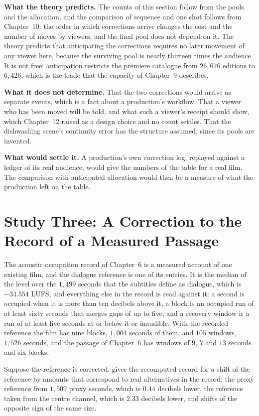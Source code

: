 \documentclass[11pt,twoside,openright]{book}
\theoremstyle{plain}
\theoremstyle{definition}
\theoremstyle{remark}
\begin{document}
\textbf{What the theory predicts.} The counts of this section follow from the pools and the allocation, and the comparison of sequence and one shot follows from Chapter~10: the order in which corrections arrive changes the cost and the number of moves by viewers, and the final pool does not depend on it. The theory predicts that anticipating the corrections requires no later movement of any viewer here, because the surviving pool is nearly thirteen times the audience. It is not free: anticipation restricts the premiere catalogue from $26{,}676$ editions to $6{,}426$, which is the trade that the capacity of Chapter~9 describes.

\textbf{What it does not determine.} That the two corrections would arrive as separate events, which is a fact about a production's workflow. That a viewer who has been moved will be told, and what such a viewer's receipt should show, which Chapter~12 raised as a design choice and no count settles. That the dishwashing scene's continuity error has the structure assumed, since its pools are invented.

\textbf{What would settle it.} A production's own correction log, replayed against a ledger of its real audience, would give the numbers of the table for a real film. The comparison with anticipated allocation would then be a measure of what the production left on the table.

\section{Study Three: A Correction to the Record of a Measured Passage}\label{sec:passage17}

The acoustic occupation record of Chapter~6 is a measured account of one existing film, and the dialogue reference is one of its entries. It is the median of the level over the $1{,}499$ seconds that the subtitles define as dialogue, which is $-34.554$ LUFS, and everything else in the record is read against it: a second is occupied when it is more than ten decibels above it, a block is an occupied run of at least sixty seconds that merges gaps of up to five, and a recovery window is a run of at least five seconds at or below it or inaudible. With the recorded reference the film has nine blocks, $1{,}004$ seconds of them, and $105$ windows, $1{,}526$ seconds, and the passage of Chapter~6 has windows of $9$, $7$ and $13$ seconds and six blocks.

Suppose the reference is corrected.  gives the recomputed record for a shift of the reference by amounts that correspond to real alternatives in the record: the proxy reference from $1{,}509$ proxy seconds, which is $0.44$ decibels lower, the reference taken from the centre channel, which is $2.33$ decibels lower, and shifts of the opposite sign of the same size.
\end{document}
